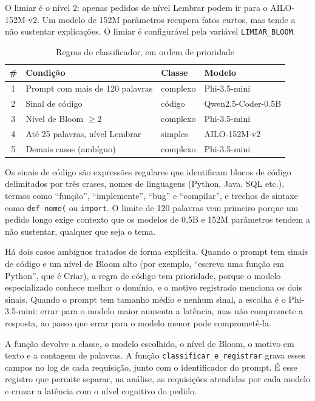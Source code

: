 O limiar é o nível 2: apenas pedidos de nível Lembrar podem ir para o AILO-152M-v2. Um modelo de 152M parâmetros recupera fatos curtos, mas tende a não sustentar explicações. O limiar é configurável pela variável \texttt{LIMIAR\_BLOOM}.

\begin{table}[ht]
\centering
\caption{Regras do classificador, em ordem de prioridade}
\label{tab:regras-classificador}
\begin{tabular}{clll}
\hline
\textbf{\#} & \textbf{Condição} & \textbf{Classe} & \textbf{Modelo} \\ \hline
1 & Prompt com mais de 120 palavras & complexo & Phi-3.5-mini \\
2 & Sinal de código & código & Qwen2.5-Coder-0.5B \\
3 & Nível de Bloom $\geq 2$ & complexo & Phi-3.5-mini \\
4 & Até 25 palavras, nível Lembrar & simples & AILO-152M-v2 \\
5 & Demais casos (ambíguo) & complexo & Phi-3.5-mini \\ \hline
\end{tabular}
\end{table}

Os sinais de código são expressões regulares que identificam blocos de código delimitados por três crases, nomes de linguagens (Python, Java, SQL etc.), termos como ``função'', ``implemente'', ``bug'' e ``compilar'', e trechos de sintaxe como \texttt{def nome(} ou \texttt{import}. O limite de 120 palavras vem primeiro porque um pedido longo exige contexto que os modelos de 0,5B e 152M parâmetros tendem a não sustentar, qualquer que seja o tema.

Há dois casos ambíguos tratados de forma explícita. Quando o prompt tem sinais de código e um nível de Bloom alto (por exemplo, ``escreva uma função em Python'', que é Criar), a regra de código tem prioridade, porque o modelo especializado conhece melhor o domínio, e o motivo registrado menciona os dois sinais. Quando o prompt tem tamanho médio e nenhum sinal, a escolha é o Phi-3.5-mini: errar para o modelo maior aumenta a latência, mas não compromete a resposta, ao passo que errar para o modelo menor pode comprometê-la.

A função devolve a classe, o modelo escolhido, o nível de Bloom, o motivo em texto e a contagem de palavras. A função \texttt{classificar\_e\_registrar} grava esses campos no log de cada requisição, junto com o identificador do prompt. É esse registro que permite separar, na análise, as requisições atendidas por cada modelo e cruzar a latência com o nível cognitivo do pedido.


